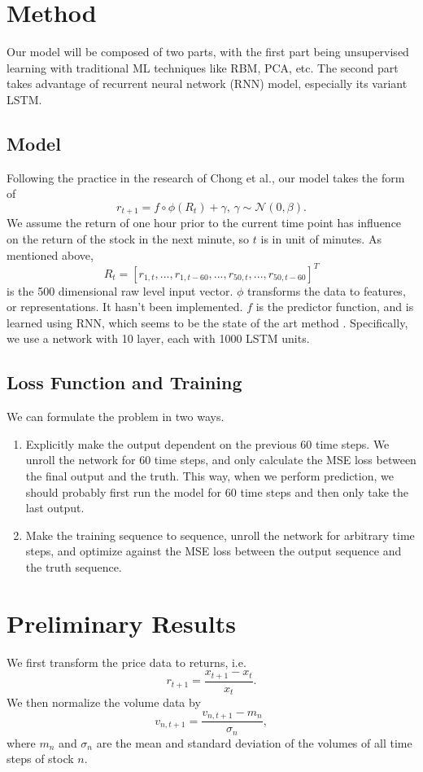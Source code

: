 \documentclass{article}
\begin{document}
\section{Method}
Our model will be composed of two parts, with the first part being unsupervised learning with traditional ML techniques like RBM, PCA, etc. The second part takes advantage of recurrent neural network (RNN) model, especially its variant LSTM. 

\subsection{Model}

Following the practice in the research of Chong et al.\cite{Chong2017}, our model takes the form of
\[r_{t+1}=f\circ\phi(R_t)+\gamma,\,\gamma\sim\mathcal{N}(0,\beta).\]
We assume the return of one hour prior to the current time point has influence on the return of the stock in the next minute, so $t$ is in unit of minutes. As mentioned above, 
\[R_t = [r_{1,t},...,r_{1,t-60},...,r_{50,t},...,r_{50,t-60}]^T\] 
is the 500 dimensional raw level input vector. $\phi$ transforms the data to features, or representations. It hasn't been implemented. $f$ is the predictor function, and is learned using RNN, which seems to be the state of the art method \cite{Abe2018}. Specifically, we use a network with 10 layer, each with 1000 LSTM units.

\subsection{Loss Function and Training}
We can formulate the problem in two ways.
\begin{enumerate}
	\item Explicitly make the output dependent on the previous 60 time steps. We unroll the network for 60 time steps, and only calculate the MSE loss between the final output and the truth. This way, when we perform prediction, we should probably first run the model for 60 time steps and then only take the last output.
	\item Make the training sequence to sequence, unroll the network for arbitrary time steps, and optimize against the MSE loss between the output sequence and the truth sequence.
\end{enumerate}
 
\section{Preliminary Results} 
We first transform the price data to returns, i.e.
\[r_{t+1} = \frac{x_{t+1}-x_{t}}{x_{t}}.\]
We then normalize the volume data by
\[v_{n,t+1} = \frac{v_{n,t+1}-m_{n}}{\sigma_{n}},\]
where $m_n$ and $\sigma_n$ are the mean and standard deviation of the volumes of all time steps of stock $n$.
\end{document}
